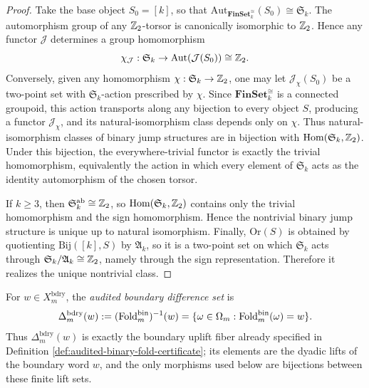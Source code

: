 \begin{proof}
Take the base object \(S_0=[k]\), so that \(\mathrm{Aut}_{\mathbf{FinSet}_k^{\cong}}(S_0)\cong \mathfrak{S}_k\).
The automorphism group of any \(\mathbb{Z}_2\)-torsor is canonically isomorphic to \(\mathbb{Z}_2\).
Hence any functor \(\mathcal J\) determines a group homomorphism
\[
\chi_{\mathcal J}:\mathfrak{S}_k\to \mathrm{Aut}(\mathcal J(S_0))\cong \mathbb{Z}_2.
\]
Conversely, given any homomorphism \(\chi:\mathfrak{S}_k\to \mathbb{Z}_2\), one may let \(\mathcal J_\chi(S_0)\) be a two-point set with \(\mathfrak{S}_k\)-action prescribed by \(\chi\).
Since \(\mathbf{FinSet}_k^{\cong}\) is a connected groupoid, this action transports along any bijection to every object \(S\), producing a functor \(\mathcal J_\chi\), and its natural-isomorphism class depends only on \(\chi\).
Thus natural-isomorphism classes of binary jump structures are in bijection with \(\mathrm{Hom}(\mathfrak{S}_k,\mathbb{Z}_2)\).  Under this bijection, the everywhere-trivial functor is exactly the trivial homomorphism, equivalently the action in which every element of \(\mathfrak S_k\) acts as the identity automorphism of the chosen torsor.
\par
If \(k\ge 3\), then \(\mathfrak{S}_k^{\mathrm{ab}}\cong \mathbb{Z}_2\), so \(\mathrm{Hom}(\mathfrak{S}_k,\mathbb{Z}_2)\) contains only the trivial homomorphism and the sign homomorphism.
Hence the nontrivial binary jump structure is unique up to natural isomorphism.
Finally, \(\mathrm{Or}(S)\) is obtained by quotienting \(\mathrm{Bij}([k],S)\) by \(\mathfrak{A}_k\), so it is a two-point set on which \(\mathfrak{S}_k\) acts through \(\mathfrak{S}_k/\mathfrak{A}_k\cong \mathbb{Z}_2\), namely through the sign representation.
Therefore it realizes the unique nontrivial class. \qedhere
\end{proof}


\begin{definition}\label{def:audited-boundary-difference-sets}
For \(w\in X_m^{\mathrm{bdry}}\), the \emph{audited boundary difference set} is
\[
\Delta_m^{\mathrm{bdry}}(w)
:=(\operatorname{Fold}_m^{\mathrm{bin}})^{-1}(w)
=\{\omega\in\Omega_m:\operatorname{Fold}_m^{\mathrm{bin}}(\omega)=w\}.
\]
Thus \(\Delta_m^{\mathrm{bdry}}(w)\) is exactly the boundary uplift fiber already specified in Definition \ref{def:audited-binary-fold-certificate}; its elements are the dyadic lifts of the boundary word \(w\), and the only morphisms used below are bijections between these finite lift sets.
\end{definition}


